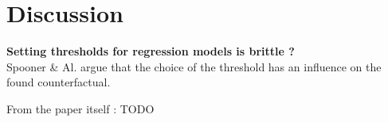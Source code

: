 \section{Discussion}
\label{sec:discussion}
\textbf{Setting thresholds for regression models is brittle ?}\\
Spooner \& Al. \cite{spooner_counterfactual_2021} argue that the choice of the threshold has an influence on the found counterfactual.

From the paper itself : TODO
